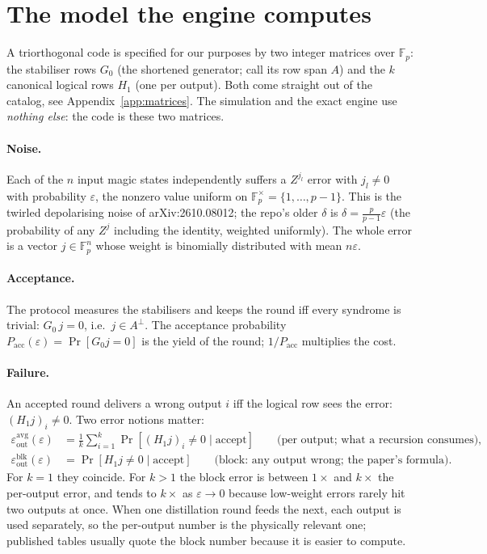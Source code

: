 \documentclass[11pt]{article}
\newcommand{\eps}{\varepsilon}
\newcommand{\F}{\mathbb{F}}
\begin{document}
\section{The model the engine computes}
\label{sec:model}

A triorthogonal code is specified for our purposes by two integer matrices over
$\F_p$: the stabiliser rows $G_0$ (the shortened generator; call its row span $A$)
and the $k$ canonical logical rows $H_1$ (one per output). Both come straight out of
the catalog, see Appendix~\ref{app:matrices}. The simulation and the exact engine
use \emph{nothing else}: the code is these two matrices.

\paragraph{Noise.} Each of the $n$ input magic states independently suffers a
$Z^{j_l}$ error with $j_l\neq 0$ with probability $\eps$, the nonzero value uniform on
$\F_p^{\times}=\{1,\dots,p-1\}$. This is the twirled depolarising noise of
arXiv:2610.08012; the repo's older $\delta$ is $\delta = \tfrac{p}{p-1}\eps$ (the
probability of any $Z^{j}$ including the identity, weighted uniformly). The whole
error is a vector $j\in\F_p^n$ whose weight is binomially distributed with mean
$n\eps$.

\paragraph{Acceptance.} The protocol measures the stabilisers and keeps the round
iff every syndrome is trivial: $G_0\,j = 0$, i.e.\ $j\in A^{\perp}$. The acceptance
probability $P_{\mathrm{acc}}(\eps) = \Pr[G_0 j = 0]$ is the yield of the round;
$1/P_{\mathrm{acc}}$ multiplies the cost.

\paragraph{Failure.} An accepted round delivers a wrong output $i$ iff the logical
row sees the error: $(H_1 j)_i \neq 0$. Two error notions matter:
\begin{align*}
\eps_{\mathrm{out}}^{\mathrm{avg}}(\eps) &= \frac1k\sum_{i=1}^{k}\Pr[(H_1 j)_i\neq 0 \mid \text{accept}]
  \qquad\text{(per output; what a recursion consumes)},\\
\eps_{\mathrm{out}}^{\mathrm{blk}}(\eps) &= \Pr[H_1 j \neq 0 \mid \text{accept}]
  \qquad\text{(block: any output wrong; the paper's formula)}.
\end{align*}
For $k=1$ they coincide. For $k>1$ the block error is between $1\times$ and $k\times$
the per-output error, and tends to $k\times$ as $\eps\to0$ because low-weight errors
rarely hit two outputs at once. When one distillation round feeds the next, each
output is used separately, so the per-output number is the physically relevant one;
published tables usually quote the block number because it is easier to compute.
\end{document}

